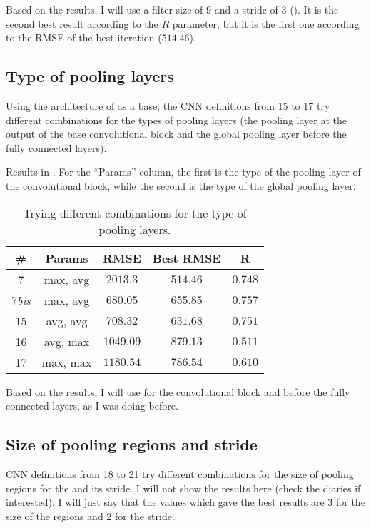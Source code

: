Based on the results, I will use a filter size of 9 and a stride of 3
(). It is the second best result according to the \(R\)
parameter, but it is the first one according to the RMSE of the best iteration
(\(514.46\)).

\subsection{Type of pooling layers}

Using the architecture of  as a base, the CNN definitions from 15
to 17 try different combinations for the types of pooling layers (the pooling
layer at the output of the base convolutional block and the global pooling
layer before the fully connected layers).

Results in . For the ``Params'' column, the
first is the type of the pooling layer of the convolutional block, while the
second is the type of the global pooling layer.

\begin{table}[hbtp]
	\centering
	\begin{tabular}{|c|c|c|c|c|}
		\toprule
		\# & Params & RMSE & Best RMSE & R \\
		\midrule
		7 & max, avg & \(2013.3\) & \(514.46\) & \(0.748\) \\
		7\emph{bis} & max, avg & \(680.05\) & \(655.85\) & \(0.757\) \\
		15 & avg, avg & \(708.32\) & \(631.68\) & \(0.751\) \\
		16 & avg, max & \(1049.09\) & \(879.13\) & \(0.511\) \\
		17 & max, max & \(1180.54\) & \(786.54\) & \(0.610\) \\
		\bottomrule
	\end{tabular}
	\caption{Trying different combinations for the type of pooling
	layers.}\label{table:cnnpoolingtypes}
\end{table}

Based on the results, I will use  for the convolutional
block and  before the fully connected layers,
as I was doing before.

\subsection{Size of pooling regions and stride}

CNN definitions from 18 to 21 try different combinations for the size of
pooling regions for the  and its stride. I will not
show the results here (check the diaries if interested): I will just say that
the values which gave the best results are 3 for the size of the regions and 2
for the stride.

